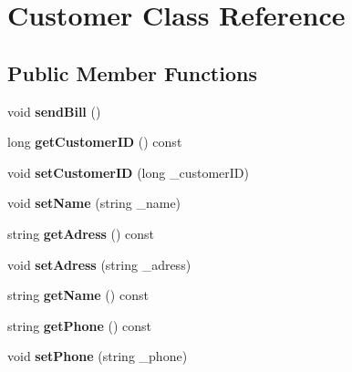 \hypertarget{classCustomer}{}\section{Customer Class Reference}
\label{classCustomer}
\subsection*{Public Member Functions}
\begin{DoxyCompactItemize}
\item 
void {\bfseries send\+Bill} ()\hypertarget{classCustomer_a927d85cfe1f6c23af8dd2a3c73561f49}{}\label{classCustomer_a927d85cfe1f6c23af8dd2a3c73561f49}

\item 
long {\bfseries get\+Customer\+ID} () const \hypertarget{classCustomer_a8cbfbca1770ee78aea3083b9a61a547c}{}\label{classCustomer_a8cbfbca1770ee78aea3083b9a61a547c}

\item 
void {\bfseries set\+Customer\+ID} (long \+\_\+customer\+ID)\hypertarget{classCustomer_acc7237a0121638d38846465ee9c2d26a}{}\label{classCustomer_acc7237a0121638d38846465ee9c2d26a}

\item 
void {\bfseries set\+Name} (string \+\_\+name)\hypertarget{classCustomer_a57953fc7e96939d1937fc7603aa31406}{}\label{classCustomer_a57953fc7e96939d1937fc7603aa31406}

\item 
string {\bfseries get\+Adress} () const \hypertarget{classCustomer_a28f1e72db25c71110fee87c3a090c913}{}\label{classCustomer_a28f1e72db25c71110fee87c3a090c913}

\item 
void {\bfseries set\+Adress} (string \+\_\+adress)\hypertarget{classCustomer_adfc9ac7abfa4bb4835106dc35739a4a6}{}\label{classCustomer_adfc9ac7abfa4bb4835106dc35739a4a6}

\item 
string {\bfseries get\+Name} () const \hypertarget{classCustomer_a059a5634b4200f56a249051954b90508}{}\label{classCustomer_a059a5634b4200f56a249051954b90508}

\item 
string {\bfseries get\+Phone} () const \hypertarget{classCustomer_abc083c1bd5bcf45d92b6ddde346a66ba}{}\label{classCustomer_abc083c1bd5bcf45d92b6ddde346a66ba}

\item 
void {\bfseries set\+Phone} (string \+\_\+phone)\hypertarget{classCustomer_a84e30f04f40a6ef54ec223756b0a59bf}{}\label{classCustomer_a84e30f04f40a6ef54ec223756b0a59bf}


\end{DoxyCompactItemize}
